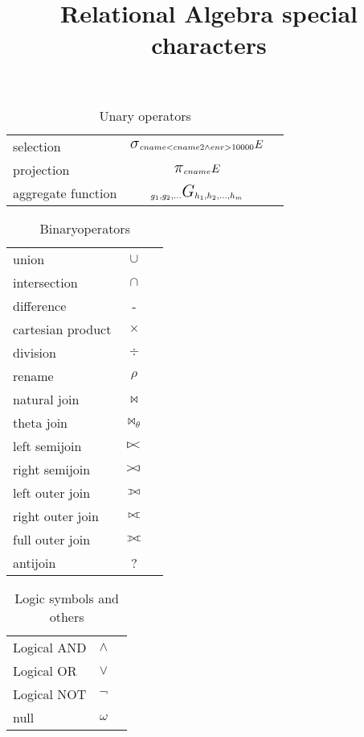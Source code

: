 \documentclass[]{article}
\def\ojoin{\setbox0=\hbox{$\bowtie$}%
  \rule[-.02ex]{.25em}{.4pt}\llap{\rule[\ht0]{.25em}{.4pt}}}
\def\leftouterjoin{\mathbin{\ojoin\mkern-5.8mu\bowtie}}
\def\rightouterjoin{\mathbin{\bowtie\mkern-5.8mu\ojoin}}
\def\fullouterjoin{\mathbin{\ojoin\mkern-5.8mu\bowtie\mkern-5.8mu\ojoin}}
\newcommand{\select}{\mbox{\Large$\sigma$}}
\newcommand{\cross}{\mbox{$\times$}}
\newcommand{\intersection}{\mbox{$\cap$}}
\newcommand{\union}{\mbox{$\cup$}}
\newcommand{\leftsemijoin}{\mbox{$\mathrel{\raise1pt\hbox{\vrule height5pt
depth0pt width0.6pt\hskip-1.5pt$>$\hskip -2.5pt$<$}}$}}
\newcommand{\rightsemijoin}{\mbox{$\mathrel{\raise1pt\hbox{\hskip-1.5pt$>$\hskip -2.5pt$<$\hskip -1.1pt\vrule height5pt
depth0pt width0.6pt}}$}}
\newcommand{\project}{\mbox{\Large$\pi$}}
\newcommand{\aggregatefn}{\mbox{\Large$G$}}
\begin{document}
\title{Relational Algebra special characters}
\maketitle

\begin{table}[!th]
\begin{tabular}{|l|c|r|}
\hline
selection &  $\select_{cname<cname2 \wedge enr>10000} E$ \\
projection &  $\project_{cname} E$ \\
aggregate function &  $_{g_1,g_2,...} \aggregatefn_{h_1,h_2,...,h_m}$ \\
\hline
\end{tabular}
\caption{Unary operators}
\end{table}

\begin{table}[!th]
\begin{tabular}{|l|c|r|}
\hline
union & 			\union \\
intersection & 		\intersection \\
difference & 		- \\
cartesian product & \cross \\
division & 			$\div$ \\
rename & 			$\rho$ \\
natural join & 		$\bowtie$ \\
theta join & 		$\bowtie_{\theta}$ \\
left semijoin & 	$\leftsemijoin$ \\
right semijoin & 	$\rightsemijoin$ \\ 
left outer join & 	$\leftouterjoin$ \\
right outer join & 	$\rightouterjoin$ \\
full outer join & 	$\fullouterjoin$ \\
antijoin & 			? \\
\hline
\end{tabular}
\caption{Binaryoperators}
\end{table}

\begin{table}[!th]
\begin{tabular}{|l|c|r|}
\hline
Logical AND & 	$\wedge$ \\
Logical OR & 	$\vee$ \\
Logical NOT & 	$\neg$ \\
null & 			$\omega$ \\
\hline
\end{tabular}
\caption{Logic symbols and others}
\end{table}
\end{document}
